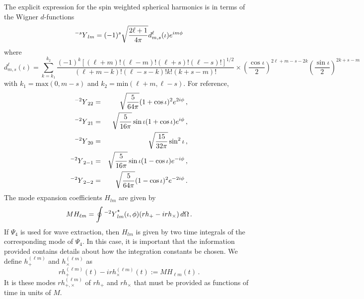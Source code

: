 \documentclass[10pt]{ligodcc}
\begin{document}
The explicit expression for the spin weighted spherical harmonics is
in terms of the Wigner $d$-functions
\begin{equation}
  \label{eq:5}
   {{}^{-s}Y}_{lm} = (-1)^s\sqrt{\frac{2\ell+1}{4\pi}} d^\ell_{m,s}(\iota)e^{im\phi}
\end{equation}
where
\begin{equation}
  \label{eq:6}
  d^\ell_{m,s}(\iota) = \sum_{k = k_1}^{k_2}
    \frac{(-1)^k[(\ell+m)!(\ell-m)!(\ell+s)!(\ell-s)!]^{1/2}}{(\ell +m
      -k)!(\ell-s-k)!k!(k+s-m)!}  
    \times \left(\frac{\cos\iota}{2}\right)^{2\ell+m-s-2k}\left(\frac{\sin\iota}{2}\right)^{2k+s-m}  
\end{equation}
with $k_1 = \textrm{max}(0, m-s)$ and $k_2=\textrm{min}(\ell+m,
\ell-s)$.  For reference,
\begin{eqnarray}
  \label{eq:7}
  {{}^{-2}Y}_{22} &=& \sqrt{\frac{5}{64\pi}}(1+\cos\iota)^2e^{2i\phi} \,,\\
  {{}^{-2}Y}_{21} &=& \sqrt{\frac{5}{16\pi}}  \sin\iota( 1 + \cos\iota )e^{i\phi} \,,\\
  {{}^{-2}Y}_{20} &=& \sqrt{\frac{15}{32\pi}} \sin^2\iota \,,\\
  {{}^{-2}Y}_{2-1} &=& \sqrt{\frac{5}{16\pi}}  \sin\iota( 1 - \cos\iota
  )e^{-i\phi} \,,\\
  {{}^{-2}Y}_{2-2} &=& \sqrt{\frac{5}{64\pi}}(1-\cos\iota)^2e^{-2i\phi}\,.
\end{eqnarray}
The mode expansion coefficients $H_{lm}$ are given by
\begin{equation}
  \label{eq:10}
  MH_{\ell m} = \oint {{}^{-2}Y}_{lm}^\star(\iota,\phi)(rh_+-irh_\times )\,d\Omega\,.
\end{equation}
If $\Psi_4$ is used for wave extraction, then $H_{lm}$ is given by two
time integrals of the corresponding mode of $\Psi_4$.  In this case, it
is important that the information provided contains details about how
the integration constants be chosen.  We define $h_+^{(\ell m)}$ and
$h_\times^{(\ell m)}$ as
\begin{equation}
  \label{eq:11}
  rh_+^{(\ell m)}(t) -irh_\times^{(\ell m)}(t) := MH_{\ell m}(t)\,.  
\end{equation}
It is these modes $rh_{+,\times}^{(\ell m)}$ of $rh_+$ and $rh_\times$
that must be provided as functions of time in units of $M$.
\end{document}
